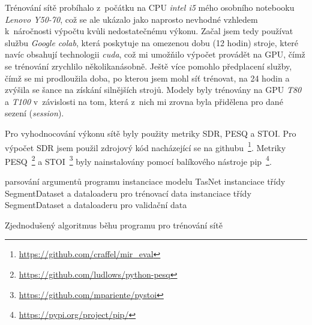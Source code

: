 Trénování sítě probíhalo z~počátku na CPU \textit{intel i5} mého osobního notebooku \textit{Lenovo Y50-70}, což se ale ukázalo jako naprosto nevhodné vzhledem k~náročnosti výpočtu kvůli nedostatečnému výkonu. Začal jsem tedy používat službu \textit{Google colab}, která poskytuje na omezenou dobu (12 hodin) stroje, které navíc obsahují technologii \textit{cuda}, což mi umožňilo výpočet provádět na GPU, čímž se trénování zrychlilo několikanásobně. Ještě více pomohlo předplacení služby, čímž se mi prodloužila doba, po kterou jsem mohl síť trénovat, na 24 hodin a zvýšila se šance na získání silnějších strojů. Modely byly trénovány na GPU \textit{T80} a \textit{T100} v~závislosti na tom, která z~nich mi zrovna byla přidělena pro dané sezení (\textit{session}). 

Pro vyhodnocování výkonu sítě byly použity metriky SDR, PESQ a STOI. Pro výpočet SDR jsem použil zdrojový kód nacházející se na githubu~\footnote{\url{https://github.com/craffel/mir_eval}}. Metriky PESQ~\footnote{\url{https://github.com/ludlows/python-pesq}} a STOI~\footnote{\url{https://github.com/mpariente/pystoi}} byly nainstalovány pomocí balíkového nástroje pip~\footnote{\url{https://pypi.org/project/pip/}}.

\bigskip
{}
\begin{algorithm}[H]
 \LinesNumbered
 parsování argumentů programu\;
 instanciace modelu TasNet\;
 instanciace třídy SegmentDataset a dataloaderu pro trénovací data\;
 instanciace třídy SegmentDataset a dataloaderu pro validační data\;
 \caption{\label{alg:zakladnibeh}Zjednodušený algoritmus běhu programu pro trénování sítě}
\end{algorithm}



